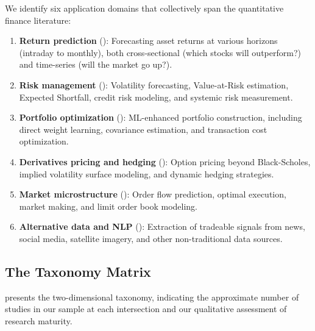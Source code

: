 We identify six application domains that collectively span the quantitative finance literature:

\begin{enumerate}[leftmargin=*]
    \item \textbf{Return prediction} (): Forecasting asset returns at various horizons (intraday to monthly), both cross-sectional (which stocks will outperform?) and time-series (will the market go up?).

    \item \textbf{Risk management} (): Volatility forecasting, Value-at-Risk estimation, Expected Shortfall, credit risk modeling, and systemic risk measurement.

    \item \textbf{Portfolio optimization} (): ML-enhanced portfolio construction, including direct weight learning, covariance estimation, and transaction cost optimization.

    \item \textbf{Derivatives pricing and hedging} (): Option pricing beyond Black-Scholes, implied volatility surface modeling, and dynamic hedging strategies.

    \item \textbf{Market microstructure} (): Order flow prediction, optimal execution, market making, and limit order book modeling.

    \item \textbf{Alternative data and NLP} (): Extraction of tradeable signals from news, social media, satellite imagery, and other non-traditional data sources.
\end{enumerate}

\subsection{The Taxonomy Matrix}

 presents the two-dimensional taxonomy, indicating the approximate number of studies in our sample at each intersection and our qualitative assessment of research maturity.

